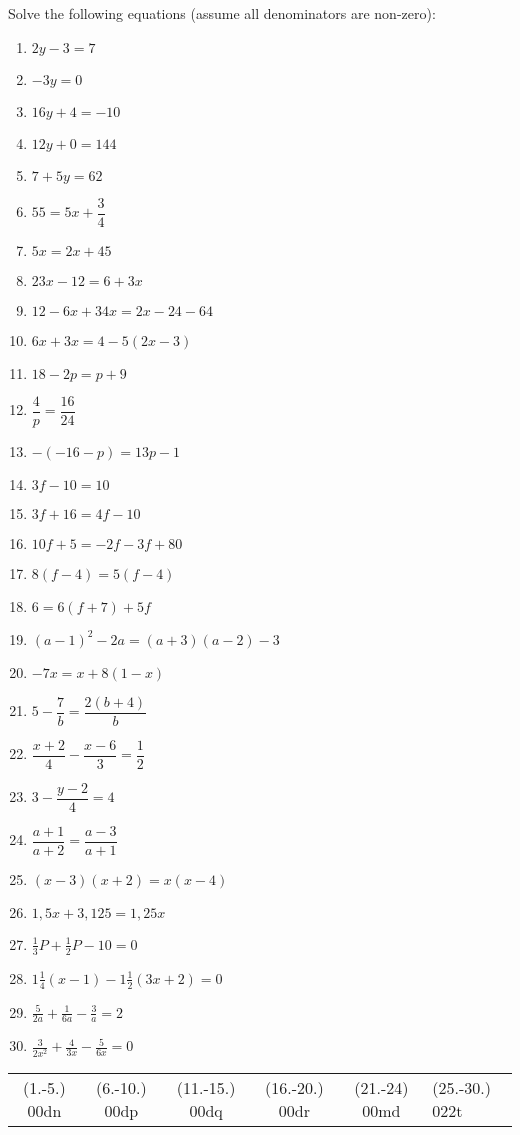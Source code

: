 \begin{exercises}{}
{Solve the following equations (assume all denominators are non-zero):

\begin{multicols}{2}
\begin{enumerate}[itemsep=6pt, label=\textbf{\arabic*}. ] 
\item   $2y-3=7$
\item   $-3y=0$        
\item   $16y+4=-10$        
\item   $12y+0=144$
\item   $7+5y=62$       
\item   $55=5x+\dfrac{3}{4}$ 
\item   $5x=2x+45$        
\item   $23x-12=6+3x$
\item   $12-6x+34x=2x-24-64$
\item   $6x+3x=4-5(2x-3)$
\item   $18-2p=p+9$   
\item   $\dfrac{4}{p}=\dfrac{16}{24}$
\item   $-(-16-p)=13p-1$
\item   $3f-10=10$
\item   $3f+16=4f-10$
\item   $10f+5=-2f-3f+80$
\item   $8(f-4)=5(f-4)$
\item  $6=6(f+7)+5f$      
\item $(a-1)^{2} - 2a = (a+3)(a-2) - 3$
\item $-7x = x+8(1-x)$ 
\item $5-\dfrac{7}{b} = \dfrac{2(b+4)}{b}$
\item $\dfrac{x+2}{4} - \dfrac{x-6}{3} = \dfrac{1}{2}$
\item $ 3 - \dfrac{y-2}{4} = 4$
\item $ \dfrac{a+1}{a+2} = \dfrac{a-3}{a+1}$
\item $(x-3)(x+2)=x(x-4)$
\item $1,5x+3,125=1,25x$
\item $\frac{1}{3}P + \frac{1}{2}P - 10 = 0$
\item $1 \frac{1}{4} (x-1)-1\frac{1}{2}(3x+2)=0$
\item $\frac{5}{2a}+\frac{1}{6a}-\frac{3}{a}=2$
\item $\frac{3}{2x^2}+\frac{4}{3x}-\frac{5}{6x}=0$  
\end{enumerate}
\end{multicols}
\practiceinfo
\par 
\par \begin{tabular}[h]{ccccc}
(1.-5.) 00dn&  (6.-10.) 00dp&  (11.-15.) 00dq&  (16.-20.) 00dr& (21.-24) 00md & (25.-30.) 022t & \end{tabular}
}
\end{exercises}

